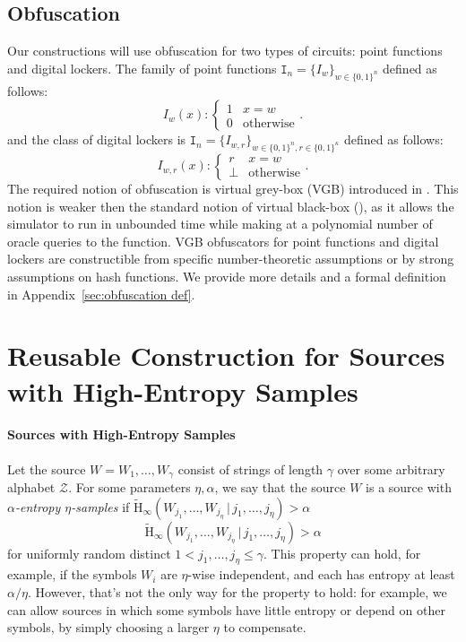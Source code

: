 \documentclass[11pt]{article}
\newcommand{\apref}[1]{\mbox{Appendix~\ref{#1}}}
\newcommand{\zo}{\ensuremath{\{0, 1\}}}
\newcommand{\Hav}{\tilde{\mathrm{H}}_\infty}
\newcommand{\subsetEntropy}{\alpha}
\begin{document}
\subsection{Obfuscation}
Our constructions will use obfuscation for two types of circuits: point functions and digital lockers. The family of point functions $\mathtt{I}_n = \{I_w\}_{w \in \zo^n}$ defined as follows:
\[
I_w(x):\begin{cases} 1 & x=w\\0 & \text{otherwise}\end{cases}.
\]
and the class of digital lockers is $\mathtt{I}_n = \{I_{w, r}\}_{w \in \zo^n, r\in\zo^\kappa}$ defined as follows:
\[
I_{w, r}(x):\begin{cases} r & x=w\\\perp & \text{otherwise}\end{cases}.
\]
The required notion of obfuscation is virtual grey-box (VGB) introduced in \cite{bitansky2010strong}. This notion is weaker then the standard notion of virtual black-box (\cite{barak2001possibility}), as it allows the simulator to run in unbounded time while making at a polynomial number of oracle queries to the function. VGB obfuscators for point functions and digital lockers are constructible from specific number-theoretic assumptions or by strong assumptions on hash functions.  We provide more details and a formal definition in \apref{sec:obfuscation def}.

\section{Reusable Construction for Sources with High-Entropy Samples}
\label{sec:sampling}

\paragraph{Sources with High-Entropy Samples}
Let the source $W=W_1, \dots, W_\gamma$ consist of strings of length $\gamma$ over some arbitrary alphabet $\mathcal{Z}$. For some parameters $\eta, \subsetEntropy$, we say that the source $W$ is a source with  \emph{$\subsetEntropy$-entropy $\eta$-samples} if 
\ifnum{}
$\Hav(W_{j_1}, \dots, W_{j_\eta}\, |\, j_1, \dots, j_\eta)>\subsetEntropy$ 
\else
\[
\Hav(W_{j_1}, \dots, W_{j_\eta}\, |\, j_1, \dots, j_\eta)>\subsetEntropy
\]
\fi
for uniformly random distinct $1< j_1, \dots, j_\eta \le \gamma$. This property can hold, for example, if the symbols $W_i$ are $\eta$-wise independent, and each has entropy at least $\subsetEntropy/\eta$. However, that's not the only way for the property to hold: for example, we can allow sources in which some symbols have little entropy or depend on other symbols, by simply choosing a larger $\eta$ to compensate.
\end{document}
